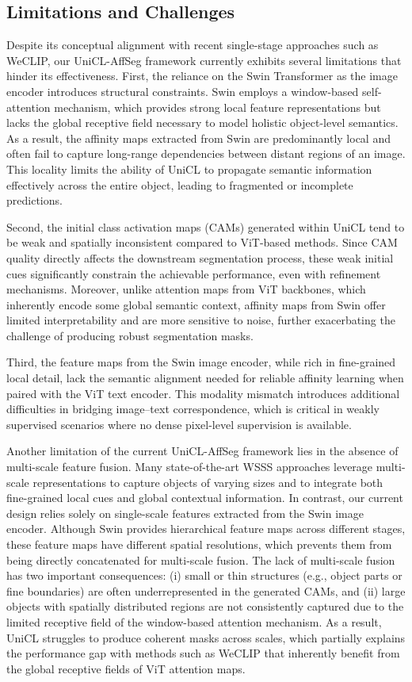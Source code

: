 \subsection{Limitations and Challenges}
\label{subsec:limitations_and_challenges}
Despite its conceptual alignment with recent single-stage approaches such as WeCLIP, our UniCL-AffSeg  framework currently exhibits several limitations that hinder its effectiveness. First, the reliance on the Swin Transformer as the image encoder introduces structural constraints. Swin employs a window-based self-attention mechanism, which provides strong local feature representations but lacks the global receptive field necessary to model holistic object-level semantics. As a result, the affinity maps extracted from Swin are predominantly local and often fail to capture long-range dependencies between distant regions of an image. This locality limits the ability of UniCL to propagate semantic information effectively across the entire object, leading to fragmented or incomplete predictions.  

Second, the initial class activation maps (CAMs) generated within UniCL tend to be weak and spatially inconsistent compared to ViT-based methods. Since CAM quality directly affects the downstream segmentation process, these weak initial cues significantly constrain the achievable performance, even with refinement mechanisms. Moreover, unlike attention maps from ViT backbones, which inherently encode some global semantic context, affinity maps from Swin offer limited interpretability and are more sensitive to noise, further exacerbating the challenge of producing robust segmentation masks.  

Third, the feature maps from the Swin image encoder, while rich in fine-grained local detail, lack the semantic alignment needed for reliable affinity learning when paired with the ViT text encoder. This modality mismatch introduces additional difficulties in bridging image–text correspondence, which is critical in weakly supervised scenarios where no dense pixel-level supervision is available.  

Another limitation of the current UniCL-AffSeg  framework lies in the absence of multi-scale feature fusion. Many state-of-the-art WSSS approaches leverage multi-scale representations to capture objects of varying sizes and to integrate both fine-grained local cues and global contextual information. In contrast, our current design relies solely on single-scale features extracted from the Swin image encoder. Although Swin provides hierarchical feature maps across different stages, these feature maps have different spatial resolutions, which prevents them from being directly concatenated for multi-scale fusion. The lack of multi-scale fusion has two important consequences: (i) small or thin structures (e.g., object parts or fine boundaries) are often underrepresented in the generated CAMs, and (ii) large objects with spatially distributed regions are not consistently captured due to the limited receptive field of the window-based attention mechanism. As a result, UniCL struggles to produce coherent masks across scales, which partially explains the performance gap with methods such as WeCLIP that inherently benefit from the global receptive fields of ViT attention maps.
 

